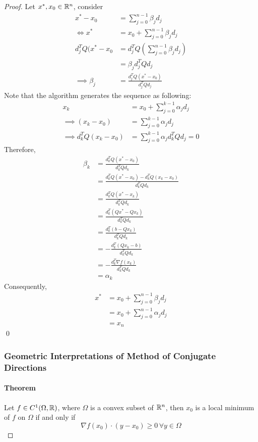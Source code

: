 \documentclass[11pt]{article}
\begin{document}
\begin{proof}
	Let $x^*, x_0 \in \mathbb{R}^n$, consider
	\begin{align}
		x^* - x_0 &= \sum_{j=0}^{n-1}\beta_j d_j \\
		\iff x^* &= x_0 + \sum_{j=0}^{n-1} \beta_j d_j \\
		d_j^TQ(x^* - x_0 &= d_j^TQ(\sum_{j=0}^{n-1} \beta_j d_j) \\
		&= \beta_j d_j^T Q d_j \\
		\implies \beta_j &= \frac{d_j^TQ(x^* - x_0)}{d_j^TQd_j}
	\end{align}
Note that the algorithm generates the sequence as following:
\begin{align}
	x_k &= x_0 + \sum_{j=0}^{k-1} \alpha_j d_j \\
	\implies (x_k - x_0) &= \sum_{j=0}^{k-1} \alpha_j d_j \\
	\implies d_k^TQ(x_k - x_0) &= \sum_{j=0}^{k-1} \alpha_j d_k^T Q d_j = 0
\end{align}
Therefore,
\begin{align}
	\beta_k &= \frac{d_k^TQ(x^* - x_0)}{d_k^TQd_k} \\
	&= \frac{d_k^TQ(x^* - x_0) - d_k^TQ(x_k - x_0)}{d_k^TQd_k} \\
	&= \frac{d_k^TQ(x^* - x_k)}{d_k^TQd_k} \\
	&= \frac{d_k^T(Qx^* - Qx_k)}{d_k^TQd_k} \\
	&= \frac{d_k^T(b - Qx_k)}{d_k^TQd_k} \tag{The first order necessary condition suggests $Qx^* = b$} \\
	&= -\frac{d_k^T(Qx_k - b)}{d_k^TQd_k} \\
	&= -\frac{d_k^T\nabla f(x_k)}{d_k^TQd_k}　\tag{Assuming $f$ is quadratic} \\
	&= \alpha_k
\end{align}
Consequently,
\begin{align}
	x^* &= x_0 + \sum_{j=0}^{n-1}\beta_j d_j \\
	&= x_0 + \sum_{j=0}^{n-1} \alpha_j d_j \\
	&= x_n
\end{align}
\qed

\subsubsection{Geometric Interpretations of Method of Conjugate Directions}
\paragraph{Theorem} Let $f \in C^1 (\Omega, \mathbb{R})$, where $\Omega$ is a convex subset of $\mathbb{R}^n$, then $x_0$ is a local minimum of $f$ on $\Omega$ if and only if 
$$\nabla f(x_0) \cdot (y - x_0) \geq 0 \, \forall y\in \Omega$$

\end{proof}
\end{document}
